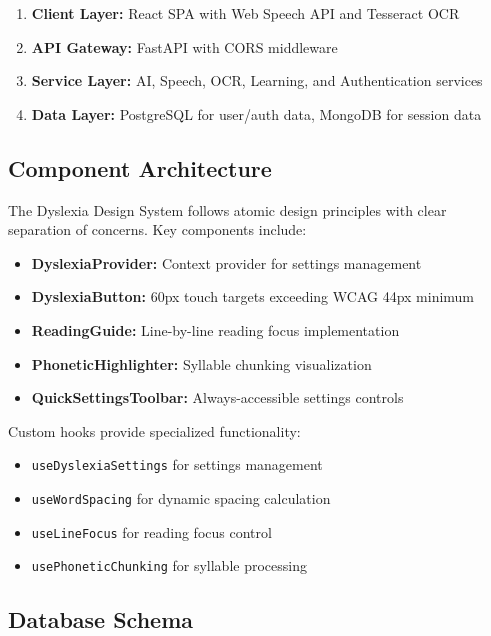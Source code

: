 \documentclass[journal]{IEEEtran}
\begin{document}
\begin{enumerate}
    \item \textbf{Client Layer:} React SPA with Web Speech API and Tesseract OCR
    \item \textbf{API Gateway:} FastAPI with CORS middleware
    \item \textbf{Service Layer:} AI, Speech, OCR, Learning, and Authentication services
    \item \textbf{Data Layer:} PostgreSQL for user/auth data, MongoDB for session data
\end{enumerate}

\subsection{Component Architecture}

The Dyslexia Design System follows atomic design principles with clear separation of concerns. Key components include:

\begin{itemize}
    \item \textbf{DyslexiaProvider:} Context provider for settings management
    \item \textbf{DyslexiaButton:} 60px touch targets exceeding WCAG 44px minimum
    \item \textbf{ReadingGuide:} Line-by-line reading focus implementation
    \item \textbf{PhoneticHighlighter:} Syllable chunking visualization
    \item \textbf{QuickSettingsToolbar:} Always-accessible settings controls
\end{itemize}

Custom hooks provide specialized functionality:
\begin{itemize}
    \item \texttt{useDyslexiaSettings} for settings management
    \item \texttt{useWordSpacing} for dynamic spacing calculation
    \item \texttt{useLineFocus} for reading focus control
    \item \texttt{usePhoneticChunking} for syllable processing
\end{itemize}

\subsection{Database Schema}
\end{document}
